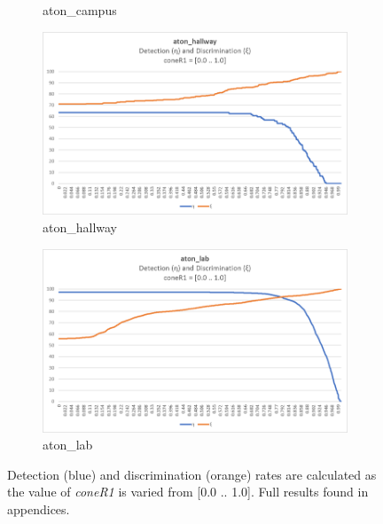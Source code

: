 \begin{figure}
\begin{subfigure}{.45\linewidth}
  \caption{aton\_campus}
\end{subfigure}
\hfill
\begin{subfigure}{.45\linewidth}
  \includegraphics[width=1\linewidth]{figures/hallway_coneR1_response.jpg}
  \caption{aton\_hallway}
\end{subfigure}
\hfill
\begin{subfigure}{.45\linewidth}
  \includegraphics[width=1\linewidth]{figures/lab_coneR1_response.jpg}
  \caption{aton\_lab}
\end{subfigure}

\caption{Detection (blue) and discrimination (orange) rates are calculated as the value of \textit{coneR1} is varied from [0.0 .. 1.0]. Full results found in appendices.}
\label{fig:coneR1_iterate}
\end{figure}

